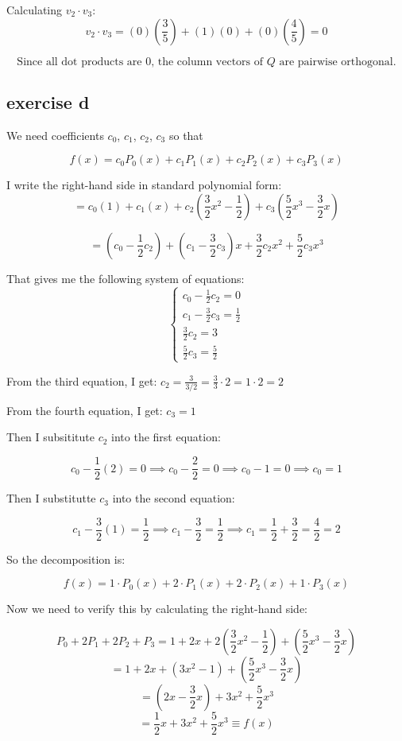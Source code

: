 \documentclass[11pt, a4paper]{article}
\begin{document}
Calculating $v_2 \cdot v_3$:
\[
v_2 \cdot v_3 = (0)\left(\frac{3}{5}\right) + (1)(0) + (0)\left(\frac{4}{5}\right) = 0
\]


\[
\boxed{\text{Since all dot products are 0, the column vectors of $Q$ are pairwise orthogonal.}}
\]


\subsection*{exercise d}

We need coefficients $c_0$, $c_1$, $c_2$, $c_3$ so that

\[
f(x) = c_0 P_0(x) + c_1 P_1(x) + c_2 P_2(x) + c_3 P_3(x)
\]

I write the right-hand side in standard polynomial form:
\[
= c_0 (1) + c_1 (x) + c_2 (\frac{3}{2} x^2 - \frac{1}{2}) + c_3 (\frac{5}{2}x^3 - \frac{3}{2} x)
\]

\[
= (c_0 - \frac{1}{2} c_2) + (c_1 - \frac{3}{2} c_3)x + \frac{3}{2} c_2 x^2 + \frac{5}{2} c_3 x^3
\]

That gives me the following system of equations:
\[
\begin{cases}
	c_0 - \frac{1}{2} c_2 = 0 \\
	c_1 - \frac{3}{2} c_3 = \frac{1}{2} \\
	\frac{3}{2} c_2 = 3 \\
	\frac{5}{2} c_3 = \frac{5}{2}
	
\end{cases}
\]

From the third equation, I get: $c_2 = \frac{3}{3/2} = \frac{3}{3} \cdot 2 = 1 \cdot 2 = 2$

From the fourth equation, I get: $c_3 = 1$

Then I subsititute $c_2$ into the first equation:

\[
c_0 - \frac{1}{2} (2) = 0 \implies c_0 - \frac{2}{2} = 0 \implies c_0 - 1 = 0 \implies c_0 = 1
\]

Then I substitutte $c_3$ into the second equation:

\[
c_1 - \frac{3}{2} (1) = \frac{1}{2} \implies c_1 - \frac{3}{2} = \frac{1}{2} \implies c_1 = \frac{1}{2} + \frac{3}{2} = \frac{4}{2} = 2
\]

So the decomposition is:

\[
f(x) = 1 \cdot P_0(x) + 2 \cdot P_1(x) + 2 \cdot P_2(x) + 1 \cdot P_3(x)
\]

Now we need to verify this by calculating the right-hand side:

\[
P_0 + 2P_1 + 2P_2 + P_3 = 1 + 2x + 2(\frac{3}{2}x^2 - \frac{1}{2}) + (\frac{5}{2}x^3 - \frac{3}{2}x)
\]
\[
= 1 + 2x + (3x^2 - 1) + (\frac{5}{2}x^3 - \frac{3}{2}x)
\]
\[
= (2x - \frac{3}{2}x) + 3x^2 + \frac{5}{2}x^3
\]
\[
= \frac{1}{2}x + 3x^2 + \frac{5}{2}x^3 \equiv f(x)
\]
\end{document}

